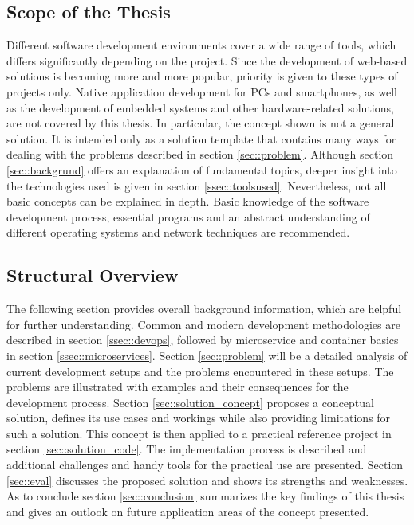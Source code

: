     \subsection{Scope of the Thesis}
    Different software development environments cover a wide range of tools, which differs significantly depending on the project. Since the development of web-based solutions is becoming more and more popular, priority is given to these types of projects only. Native application development for PCs and smartphones, as well as the development of embedded systems and other hardware-related solutions, are not covered by this thesis.\newline
    In particular, the concept shown is not a general solution. It is intended only as a solution template that contains many ways for dealing with the problems described in section \ref{sec::problem}. Although section \ref{sec::backgrund} offers an explanation of fundamental topics, deeper insight into the technologies used is given in section \ref{ssec::toolsused}. Nevertheless, not all basic concepts can be explained in depth. Basic knowledge of the software development process, essential programs and an abstract understanding of different operating systems and network techniques are recommended.

    \subsection{Structural Overview}
    The following section provides overall background information, which are helpful for further understanding. Common and modern development methodologies are described in section \ref{ssec::devops}, followed by microservice and container basics in section \ref{ssec::microservices}. Section \ref{sec::problem} will be a detailed analysis of current development setups and the problems encountered in these setups. The problems are illustrated with examples and their consequences for the development process. Section \ref{sec::solution_concept} proposes a conceptual solution, defines its use cases and workings while also providing limitations for such a solution. This concept is then applied to a practical reference project in section \ref{sec::solution_code}. The implementation process is described and additional challenges and handy tools for the practical use are presented. Section \ref{sec::eval} discusses the proposed solution and shows its strengths and weaknesses. As to conclude section \ref{sec::conclusion} summarizes the key findings of this thesis and gives an outlook on future application areas of the concept presented.

